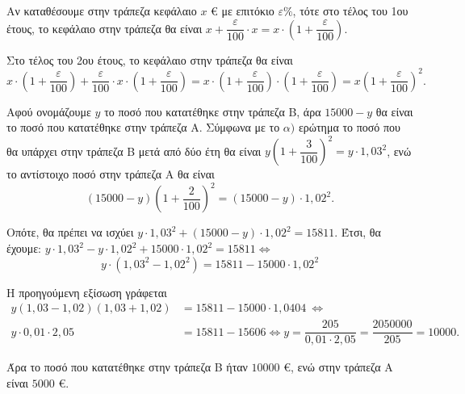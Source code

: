 
\begin{alist}
\item Αν καταθέσουμε στην τράπεζα κεφάλαιο $x$ € με επιτόκιο $\varepsilon \%$, τότε στο τέλος του 1ου έτους,
το κεφάλαιο στην τράπεζα θα είναι $x + \dfrac{\varepsilon}{100} \cdot x = x \cdot \left(1 + \dfrac{\varepsilon}{100}\right)$.

Στο τέλος του 2ου έτους, το κεφάλαιο στην τράπεζα θα είναι
\[x \cdot \left(1 + \dfrac{\varepsilon}{100}\right) + \dfrac{\varepsilon}{100} \cdot x \cdot \left(1 + \dfrac{\varepsilon}{100}\right) = x \cdot \left(1 + \dfrac{\varepsilon}{100}\right) \cdot \left(1 + \dfrac{\varepsilon}{100}\right) = x \left(1 + \dfrac{\varepsilon}{100}\right)^2.\]

\item 
\begin{rlist}
\item Αφού ονομάζουμε $y$ το ποσό που κατατέθηκε στην τράπεζα Β, άρα $15000 - y$ θα είναι
το ποσό που κατατέθηκε στην τράπεζα Α. Σύμφωνα με το $\alpha)$ ερώτημα το ποσό που θα
υπάρχει στην τράπεζα Β μετά από δύο έτη θα είναι $y \left(1 + \dfrac{3}{100}\right)^2 = y \cdot 1,03^2$, ενώ το
αντίστοιχο ποσό στην τράπεζα Α θα είναι
\[(15000 - y) \left(1 + \dfrac{2}{100}\right)^2 = (15000 - y) \cdot 1,02^2.\]

Οπότε, θα πρέπει να ισχύει $y \cdot 1,03^2 + (15000 - y) \cdot 1,02^2 = 15811$. Έτσι, θα
έχουμε: $y \cdot 1,03^2 - y \cdot 1,02^2 + 15000 \cdot 1,02^2 = 15811 \Leftrightarrow$
\[y \cdot (1,03^2 - 1,02^2) = 15811 - 15000 \cdot 1,02^2\]

\item Η προηγούμενη εξίσωση γράφεται
\begin{align*}
y(1,03 - 1,02)(1,03 + 1,02) &= 15811 - 15000 \cdot 1,0404 \ \Leftrightarrow \\
y \cdot 0,01 \cdot 2,05 &= 15811 - 15606 \Leftrightarrow y = \dfrac{205}{0,01 \cdot 2,05} = \dfrac{2050000}{205} = 10000.
\end{align*}

Άρα το ποσό που κατατέθηκε στην τράπεζα Β ήταν $10000$ €, ενώ στην τράπεζα Α είναι
$5000$ €.
\end{rlist}
\end{alist}

